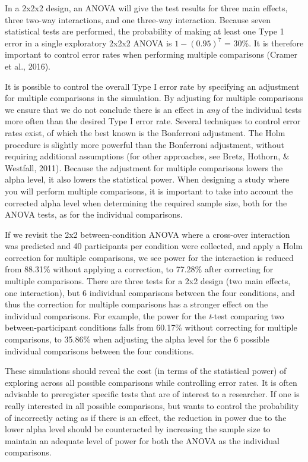 \documentclass[,jou,floatsintext]{apa6}
\begin{document}
In a 2x2x2 design, an ANOVA will give the test results for three main effects, three two-way interactions, and one three-way interaction.
Because seven statistical tests are performed, the probability of making at least one Type 1 error in a single exploratory 2x2x2 ANOVA is \(1-(0.95)^7\) = 30\%.
It is therefore important to control error rates when performing multiple comparisons (Cramer et al., 2016).

It is possible to control the overall Type I error rate by specifying an adjustment for multiple comparisons in the simulation.
By adjusting for multiple comparisons we ensure that we do not conclude there is an effect in \emph{any} of the individual tests more often than the desired Type I error rate.
Several techniques to control error rates exist, of which the best known is the Bonferroni adjustment.
The Holm procedure is slightly more powerful than the Bonferroni adjustment, without requiring additional assumptions (for other approaches, see Bretz, Hothorn, \& Westfall, 2011).
Because the adjustment for multiple comparisons lowers the alpha level, it also lowers the statistical power.
When designing a study where you will perform multiple comparisons, it is important to take into account the corrected alpha level when determining the required sample size, both for the ANOVA tests, as for the individual comparisons.

If we revisit the 2x2 between-condition ANOVA where a cross-over interaction was predicted and 40 participants per condition were collected, and apply a Holm correction for multiple comparisons, we see power for the interaction is reduced from 88.31\% without applying a correction, to 77.28\% after correcting for multiple comparisons.
There are three tests for a 2x2 design (two main effects, one interaction), but 6 individual comparisons between the four conditions, and thus the correction for multiple comparisons has a stronger effect on the individual comparisons.
For example, the power for the \emph{t}-test comparing two between-participant conditions falls from 60.17\% without correcting for multiple comparisons, to 35.86\% when adjusting the alpha level for the 6 possible individual comparisons between the four conditions.

These simulations should reveal the cost (in terms of the statistical power) of exploring across all possible comparisons while controlling error rates.
It is often advisable to preregister specific tests that are of interest to a researcher.
If one is really interested in all possible comparisons, but wants to control the probability of incorrectly acting as if there is an effect, the reduction in power due to the lower alpha level should be counteracted by increasing the sample size to maintain an adequate level of power for both the ANOVA as the individual comparisons.
\end{document}
